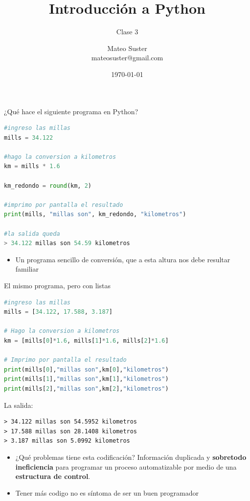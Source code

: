\documentclass{beamer}
\title[Intro Prog] %
{Introducción a Python}
\subtitle
{Clase 3}
\author[MS]
{Mateo Suster \\ mateosuster@gmail.com}%
\institute[UNGS] %
{
  Matemática para Economistas III \\ 
  Instituto de Industria\\
  Universidad Nacional de General Sarmiento
}
\date[] %
{ \today}
\begin{document}
\begin{frame}
  \titlepage
\end{frame}


\begin{frame}[fragile]{¿Qué hace el siguiente programa en Python?} 

\begin{lstlisting}[language=Python]
#ingreso las millas 
mills = 34.122

#hago la conversion a kilometros
km = mills * 1.6

km_redondo = round(km, 2)

#imprimo por pantalla el resultado
print(mills, "millas son", km_redondo, "kilometros")

#la salida queda 
> 34.122 millas son 54.59 kilometros
\end{lstlisting} \pause

\begin{itemize}
    \item Un programa sencillo de conversión, que a esta altura nos debe resultar familiar
\end{itemize}
\end{frame}


\begin{frame}[fragile]{El mismo programa, pero con listas}
\begin{lstlisting}[language=Python]
#ingreso las millas 
mills = [34.122, 17.588, 3.187] 

# Hago la conversion a kilometros
km = [mills[0]*1.6, mills[1]*1.6, mills[2]*1.6]

# Imprimo por pantalla el resultado
print(mills[0],"millas son",km[0],"kilometros")  
print(mills[1],"millas son",km[1],"kilometros")  
print(mills[2],"millas son",km[2],"kilometros")
\end{lstlisting} \pause

La salida:
\begin{lstlisting}
> 34.122 millas son 54.5952 kilometros
> 17.588 millas son 28.1408 kilometros
> 3.187 millas son 5.0992 kilometros
\end{lstlisting} \pause

\begin{itemize}
    \item ¿Qué problemas tiene esta codificación? \pause Información duplicada y \textbf{sobretodo ineficiencia} para programar un proceso automatizable por medio de una \textbf{estructura de control}. \pause
    \item Tener más codigo no es síntoma de ser un buen programador
\end{itemize}
\end{frame}
\end{document}
